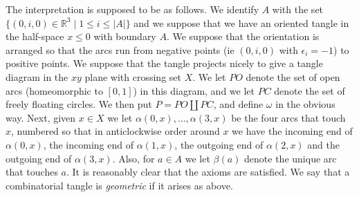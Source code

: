 \documentclass{amsart}
\newcommand{\R}         {{\mathbb{R}}}
\newcommand{\al}        {\alpha}
\newcommand{\bt}        {\beta}
\newcommand{\ep}        {\epsilon}
\newcommand{\om}        {\omega}
\newcommand{\st}        {\;|\;}
\renewcommand{\:}{\colon}
\theoremstyle{definition}
\begin{document}
The interpretation is supposed to be as follows.  We identify $A$ with
the set $\{(0,i,0)\in\R^3\st 1\leq i\leq |A|\}$ and we suppose that we
have an oriented tangle in the half-space $x\leq 0$ with boundary $A$.
We suppose that the orientation is arranged so that the arcs run from
negative points (ie $(0,i,0)$ with $\ep_i=-1$) to positive points.  We
suppose that the tangle projects nicely to give a tangle diagram in
the $xy$ plane with crossing set $X$.  We let $PO$ denote the set of
open arcs (homeomorphic to $[0,1]$) in this diagram, and we let $PC$
denote the set of freely floating circles.  We then put 
$P=PO\amalg PC$, and define $\om$ in the obvious way.  Next, given
$x\in X$ we let $\al(0,x),\dotsc,\al(3,x)$ be the four arcs that touch
$x$, numbered so that in anticlockwise order around $x$ we have the
incoming end of $\al(0,x)$, the incoming end of $\al(1,x)$, the
outgoing end of $\al(2,x)$ and the outgoing end of $\al(3,x)$.  Also,
for $a\in A$ we let $\bt(a)$ denote the unique arc that touches $a$.
It is reasonably clear that the axioms are satisfied.  We say that a
combinatorial tangle is \emph{geometric} if it arises as above.
\end{document}
